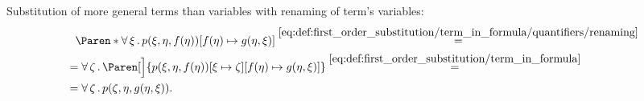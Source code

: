 \begin{example}
\begin{ExEnum}
     Substitution of more general terms than variables with renaming of term's variables:
    \begin{align*}
      &{}\phantom{=}{}
      \Paren*{\Qnt{\forall}{\xi} p(\xi, \eta, f(\eta))}[f(\eta) \mapsto g(\eta, \xi)]
      \overset {\eqref{eq:def:first_order_substitution/term_in_formula/quantifiers/renaming}} = \\ &=
      \Qnt{\forall}{\zeta} \Paren[\Big]{p(\xi, \eta, f(\eta))[\xi \mapsto \zeta][f(\eta) \mapsto g(\eta, \xi)]}
      \overset {\eqref{eq:def:first_order_substitution/term_in_formula}} = \\ &=
      \Qnt{\forall}{\zeta} p(\zeta, \eta, g(\eta, \xi)).
    \end{align*}
  \end{ExEnum}
\end{example}

